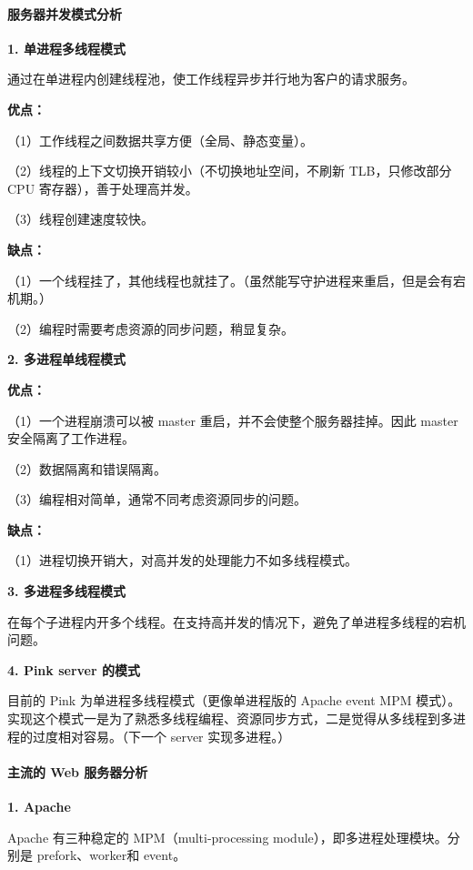 



\paragraph*{服务器并发模式分析}

{\bfseries 1. 单进程多线程模式}

通过在单进程内创建线程池，使工作线程异步并行地为客户的请求服务。

{\bfseries 优点：}

（1）工作线程之间数据共享方便（全局、静态变量）。

（2）线程的上下文切换开销较小（不切换地址空间，不刷新 T\+L\+B，只修改部分 C\+PU 寄存器），善于处理高并发。

（3）线程创建速度较快。

{\bfseries 缺点：}

（1）一个线程挂了，其他线程也就挂了。（虽然能写守护进程来重启，但是会有宕机期。）

（2）编程时需要考虑资源的同步问题，稍显复杂。

{\bfseries 2. 多进程单线程模式}

{\bfseries 优点：}

（1）一个进程崩溃可以被 master 重启，并不会使整个服务器挂掉。因此 master 安全隔离了工作进程。

（2）数据隔离和错误隔离。

（3）编程相对简单，通常不同考虑资源同步的问题。

{\bfseries 缺点：}

（1）进程切换开销大，对高并发的处理能力不如多线程模式。

{\bfseries 3. 多进程多线程模式}

在每个子进程内开多个线程。在支持高并发的情况下，避免了单进程多线程的宕机问题。

{\bfseries 4. Pink server 的模式}

目前的 Pink 为单进程多线程模式（更像单进程版的 Apache event M\+PM 模式）。实现这个模式一是为了熟悉多线程编程、资源同步方式，二是觉得从多线程到多进程的过度相对容易。（下一个 server 实现多进程。） 



\paragraph*{主流的 Web 服务器分析}

{\bfseries 1. Apache}

Apache 有三种稳定的 M\+P\+M（multi-\/processing module），即多进程处理模块。分别是 prefork、worker和 event。

